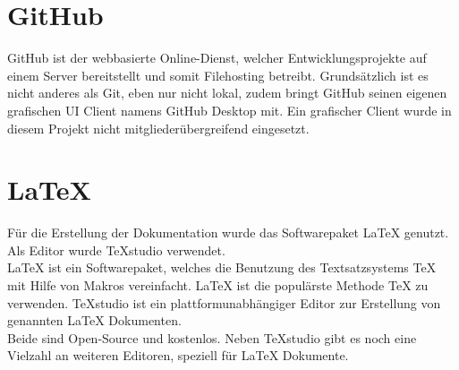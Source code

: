 \section{GitHub}
GitHub ist der webbasierte Online-Dienst, welcher Entwicklungsprojekte auf einem Server bereitstellt und somit Filehosting betreibt. Grundsätzlich ist es nicht anderes als Git, eben nur nicht lokal, zudem bringt GitHub seinen eigenen grafischen UI Client namens GitHub Desktop mit. Ein grafischer Client wurde in diesem Projekt nicht mitgliederübergreifend eingesetzt.
\section{LaTeX}
Für die Erstellung der Dokumentation wurde das Softwarepaket LaTeX genutzt. Als Editor wurde TeXstudio verwendet.\\
LaTeX ist ein Softwarepaket, welches die Benutzung des Textsatzsystems TeX mit Hilfe von Makros vereinfacht.
LaTeX ist die populärste Methode TeX zu verwenden.
TeXstudio ist ein plattformunabhängiger Editor zur Erstellung von genannten LaTeX Dokumenten.\\
Beide sind Open-Source und kostenlos. Neben TeXstudio gibt es noch eine Vielzahl an weiteren Editoren, speziell für LaTeX Dokumente.

